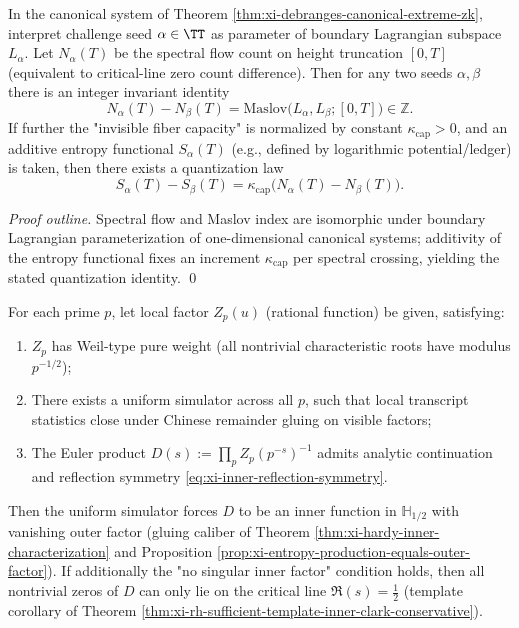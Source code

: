 \begin{proposition}\label{prop:xi-maslov-spectralflow-entropy-quantization}
In the canonical system of Theorem \ref{thm:xi-debranges-canonical-extreme-zk}, interpret challenge seed \(\alpha\in\TT\) as parameter of boundary Lagrangian subspace \(L_\alpha\).
Let \(N_\alpha(T)\) be the spectral flow count on height truncation \([0,T]\) (equivalent to critical-line zero count difference).
Then for any two seeds \(\alpha,\beta\) there is an integer invariant identity
\[
\boxed{\;
N_\alpha(T)-N_\beta(T)=\mathrm{Maslov}\bigl(L_\alpha,L_\beta;[0,T]\bigr)\in\mathbb{Z}. \;}
\]
If further the "invisible fiber capacity" is normalized by constant \(\kappa_{\mathrm{cap}}>0\), and an additive entropy functional \(S_\alpha(T)\) (e.g., defined by logarithmic potential/ledger) is taken, then there exists a quantization law
\[
\boxed{\;
S_\alpha(T)-S_\beta(T)=\kappa_{\mathrm{cap}}\bigl(N_\alpha(T)-N_\beta(T)\bigr).\;}
\]
\end{proposition}
\begin{proof}[Proof outline]
Spectral flow and Maslov index are isomorphic under boundary Lagrangian parameterization of one-dimensional canonical systems; additivity of the entropy functional fixes an increment \(\kappa_{\mathrm{cap}}\) per spectral crossing, yielding the stated quantization identity. \qed
\end{proof}

\begin{proposition}\label{prop:xi-adelic-zk-gluing-critical-line}
For each prime \(p\), let local factor \(Z_p(u)\) (rational function) be given, satisfying:
\begin{enumerate}
  \item \(Z_p\) has Weil-type pure weight (all nontrivial characteristic roots have modulus \(p^{-1/2}\));
  \item There exists a uniform simulator across all \(p\), such that local transcript statistics close under Chinese remainder gluing on visible factors;
  \item The Euler product
  \(
  D(s):=\prod_p Z_p(p^{-s})^{-1}
  \)
  admits analytic continuation and reflection symmetry \eqref{eq:xi-inner-reflection-symmetry}.
\end{enumerate}
Then the uniform simulator forces \(D\) to be an inner function in \(\mathbb{H}_{1/2}\) with vanishing outer factor (gluing caliber of Theorem \ref{thm:xi-hardy-inner-characterization} and Proposition \ref{prop:xi-entropy-production-equals-outer-factor}).
If additionally the "no singular inner factor" condition holds, then all nontrivial zeros of \(D\) can only lie on the critical line \(\Re(s)=\tfrac12\) (template corollary of Theorem \ref{thm:xi-rh-sufficient-template-inner-clark-conservative}).
\end{proposition}

